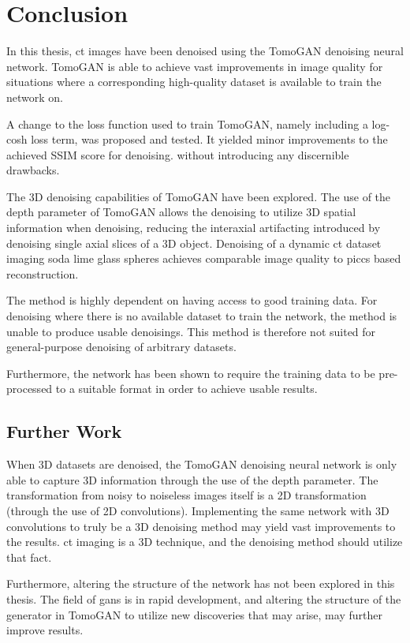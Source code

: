 \chapter{Conclusion}
\label{sec:conclusion}
In this thesis, \gls{ct} images have been denoised using the TomoGAN denoising neural network. TomoGAN is able to achieve vast improvements in image quality for situations where a corresponding high-quality dataset is available to train the network on. 

A change to the loss function used to train TomoGAN, namely including a log-cosh loss term, was proposed and tested. It yielded minor improvements to the achieved SSIM score for denoising. without introducing any discernible drawbacks. 

The 3D denoising capabilities of TomoGAN have been explored. The use of the depth parameter of TomoGAN allows the denoising to utilize 3D spatial information when denoising, reducing the interaxial artifacting introduced by denoising single axial slices of a 3D object. Denoising of a dynamic \gls{ct} dataset imaging soda lime glass spheres achieves comparable image quality to \gls{piccs} based reconstruction. 

The method is highly dependent on having access to good training data. For denoising where there is no available dataset to train the network, the method is unable to produce usable denoisings. This method is therefore not suited for general-purpose denoising of arbitrary datasets.

Furthermore, the network has been shown to require the training data to be pre-processed to a suitable format in order to achieve usable results. 


\section{Further Work}
When 3D datasets are denoised, the TomoGAN denoising neural network is only able to capture 3D information through the use of the depth parameter. The transformation from noisy to noiseless images itself is a 2D transformation (through the use of 2D convolutions). Implementing the same network with 3D convolutions to truly be a 3D denoising method may yield vast improvements to the results. \Gls{ct} imaging is a 3D technique, and the denoising method should utilize that fact.

Furthermore, altering the structure of the network has not been explored in this thesis. The field of \glspl{gan} is in rapid development, and altering the structure of the generator in TomoGAN to utilize new discoveries that may arise, may further improve results. 

